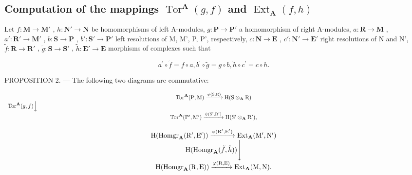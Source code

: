 \subsection{\texorpdfstring{Computation of the mappings \(\operatorname{Tor}^{\mathbf{A}}(g, f)\) and \(\operatorname{Ext}_{\mathbf{A}}(f, h)\)}{Computation of the mappings \textbackslash operatorname\{Tor\}\^{}\{\textbackslash mathbf\{A\}\}(g, f) and \textbackslash operatorname\{Ext\}\_\{\textbackslash mathbf\{A\}\}(f, h)}}

Let \(f: \mathbf{M} \to \mathbf{M}'\) , \(h: \mathbf{N}' \to \mathbf{N}\) be homomorphisms of left A-modules, \(g: \mathbf{P} \to \mathbf{P}'\) a homomorphism of right A-modules, \(a: \mathbf{R} \to \mathbf{M}\) , \(a': \mathbf{R}' \to \mathbf{M}'\) , \(b: \mathbf{S} \to \mathbf{P}\) , \(b': \mathbf{S}' \to \mathbf{P}'\) left resolutions of M, M', P, P', respectively, \(c: \mathbf{N} \to \mathbf{E}\) , \(c': \mathbf{N}' \to \mathbf{E}'\) right resolutions of N and N', \(\tilde{f}: \mathbf{R} \to \mathbf{R}'\) , \(\tilde{g}: \mathbf{S} \to \mathbf{S}'\) , \(\tilde{h}: \mathbf{E}' \to \mathbf{E}\) morphisms of complexes such that

\[
a ^ {\prime} \circ \tilde {f} = f \circ a, b ^ {\prime} \circ \tilde {g} = g \circ b, \tilde {h} \circ c ^ {\prime} = c \circ h.
\]

PROPOSITION 2. --- The following two diagrams are commutative:

\[
\begin{array}{c} \operatorname{Tor} ^ {\mathbf {A}} (\mathrm{P}, \mathrm{M}) \xrightarrow {\psi (\mathrm{S} , \mathrm{R})} \mathrm{H} (\mathrm{S} \otimes_ {\mathbf {A}} \mathrm{R}) \\ \operatorname{Tor} ^ {\mathbf {A}} (g, f) \Big \downarrow \qquad \qquad \qquad \qquad \qquad \qquad \qquad \qquad \qquad \qquad \qquad \qquad \qquad \qquad \qquad \qquad \qquad \qquad \qquad \qquad \qquad \qquad \qquad \qquad \qquad \qquad \qquad \qquad \qquad \qquad \qquad \qquad \qquad \qquad \\ \operatorname{Tor} ^ {\mathbf {A}} (\mathrm{P} ^ {\prime}, \mathrm{M} ^ {\prime}) \xrightarrow {\psi (\mathrm{S} ^ {\prime} , \mathrm{R} ^ {\prime})} \mathrm{H} (\mathrm{S} ^ {\prime} \otimes_ {\mathbf {A}} \mathrm{R} ^ {\prime})  , \end{array}
\]

\[
\begin{array}{c} \mathrm{H} (\operatorname{Homgr} _ {\mathbf {A}} (\mathrm{R} ^ {\prime}, \mathrm{E} ^ {\prime})) \xrightarrow {\varphi (\mathrm{R} ^ {\prime} , \mathrm{E} ^ {\prime})} \operatorname{Ext} _ {\mathbf {A}} (\mathrm{M} ^ {\prime}, \mathrm{N} ^ {\prime}) \\ \mathrm{H} (\operatorname{Homgr} _ {\mathbf {A}} (\tilde {f}, \tilde {h})) \Biggl \downarrow \\ \mathrm{H} (\operatorname{Homgr} _ {\mathbf {A}} (\mathrm{R}, \mathrm{E})) \xrightarrow {\varphi (\mathrm{R} , \mathrm{E})} \operatorname{Ext} _ {\mathbf {A}} (\mathrm{M}, \mathrm{N}). \end{array}
\]

